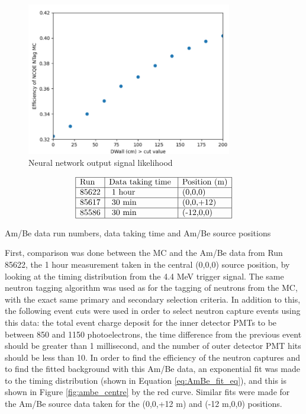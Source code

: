\begin{figure}
    \centering
    \includegraphics[width=0.8\textwidth]{Figures/efficiency_dwall.png}
    \caption{Neural network output signal likelihood }
    \label{fig:efficiency_dwall}
\end{figure}


\begin{table}
    $$
    \begin{array}{|l|l|l|l|l|}
    \hline \text{Run} & \text {Data taking time } & \text{Position (m)} \\
    \hline 85622 & \text { 1 hour} & \text{(0,0,0)} \\
    \hline 85617 & \text { 30 min} & \text{(0,0,+12)} \\
    \hline 85586 & \text { 30 min} & \text{(-12,0,0)} \\
    \hline
    \end{array}
    $$
    \caption{Am/Be data run numbers, data taking time and Am/Be source positions}
    \label{table:ambe_positions}
\end{table}

First, comparison was done between the MC and the Am/Be data from Run 85622, the 1 hour measurement taken in the central (0,0,0) source position, by looking at the timing distribution from the 4.4 MeV trigger signal. The same neutron tagging algorithm was used as for the tagging of neutrons from the MC, with the exact same primary and secondary selection criteria. In addition to this, the following event cuts were used in order to select neutron capture events using this data: the total event charge deposit for the inner detector PMTs to be between 850 and 1150 photoelectrons, the time difference from the previous event should be greater than 1 millisecond, and the number of outer detector PMT hits should be less than 10. In order to find the efficiency of the neutron captures and to find the fitted background with this Am/Be data, an exponential fit was made to the timing distribution (shown in Equation \ref{eq:AmBe_fit_eq}), and this is shown in Figure \ref{fig:ambe_centre} by the red curve. Similar fits were made for the Am/Be source data taken for the (0,0,+12 m) and (-12 m,0,0) positions. 



